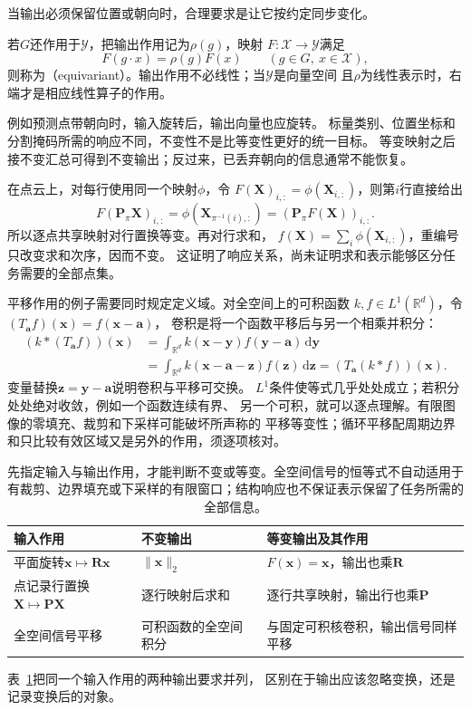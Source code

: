 当输出必须保留位置或朝向时，合理要求是让它按约定同步变化。
\begin{definition}[等变映射]
\label{def:geometry-equivariant-map}
若$G$还作用于$\mathcal Y$，把输出作用记为$\rho(g)$，映射
$F:\mathcal X\to\mathcal Y$满足
\begin{equation}
 F(g\cdot x)=\rho(g)F(x)\qquad(g\in G,\ x\in\mathcal X),
 \label{eq:geometry-equivariant-map}
\end{equation}
则称为（equivariant）。输出作用不必线性；当$\mathcal Y$是向量空间
且$\rho$为线性表示时，右端才是相应线性算子的作用。
\end{definition}
例如预测点带朝向时，输入旋转后，输出向量也应旋转。
标量类别、位置坐标和分割掩码所需的响应不同，不变性不是比等变性更好的统一目标。
等变映射之后接不变汇总可得到不变输出；反过来，已丢弃朝向的信息通常不能恢复。

在点云上，对每行使用同一个映射$\phi$，令
$F(\bm X)_{i,:}=\phi(\bm X_{i,:})$，则第$i$行直接给出
\[
 F(\bm P_\pi\bm X)_{i,:}
 =\phi(\bm X_{\pi^{-1}(i),:})
 =(\bm P_\pi F(\bm X))_{i,:}.
\]
所以逐点共享映射对行置换等变。再对行求和，
$f(\bm X)=\sum_i\phi(\bm X_{i,:})$，重编号只改变求和次序，因而不变。
这证明了响应关系，尚未证明求和表示能够区分任务需要的全部点集。

平移作用的例子需要同时规定定义域。对全空间上的可积函数
$k,f\in L^1(\mathbb R^d)$，令$(T_{\bm a}f)(\bm x)=f(\bm x-\bm a)$，
卷积是将一个函数平移后与另一个相乘并积分：
\begin{align}
 (k*(T_{\bm a}f))(\bm x)
 &=\int_{\mathbb R^d}k(\bm x-\bm y)f(\bm y-\bm a)\,\mathrm d\bm y\\
 &=\int_{\mathbb R^d}k(\bm x-\bm a-\bm z)f(\bm z)\,\mathrm d\bm z
   =(T_{\bm a}(k*f))(\bm x).
 \label{eq:geometry-translation-convolution-equivariance}
\end{align}
变量替换$\bm z=\bm y-\bm a$说明卷积与平移可交换。
$L^1$条件使等式几乎处处成立；若积分处处绝对收敛，例如一个函数连续有界、
另一个可积，就可以逐点理解。有限图像的零填充、裁剪和下采样可能破坏所声称的
平移等变性；循环平移配周期边界和只比较有效区域又是另外的作用，须逐项核对。

\begin{table}[htbp]
 \centering\small
 \begin{tabularx}{\linewidth}{@{}lXX@{}}
 \toprule
 输入作用 & 不变输出 & 等变输出及其作用\\
 \midrule
 平面旋转$\bm x\mapsto\bm R\bm x$
 & $\lVert\bm x\rVert_2$ & $F(\bm x)=\bm x$，输出也乘$\bm R$\\
 点记录行置换$\bm X\mapsto\bm P\bm X$
 & 逐行映射后求和 & 逐行共享映射，输出行也乘$\bm P$\\
 全空间信号平移
 & 可积函数的全空间积分 & 与固定可积核卷积，输出信号同样平移\\
 \bottomrule
 \end{tabularx}
 \caption{先指定输入与输出作用，才能判断不变或等变。全空间信号的恒等式不自动适用于
 有裁剪、边界填充或下采样的有限窗口；结构响应也不保证表示保留了任务所需的全部信息。}
 \label{tab:geometry-invariance-equivariance}
\end{table}
表~\ref{tab:geometry-invariance-equivariance}把同一个输入作用的两种输出要求并列，
区别在于输出应该忽略变换，还是记录变换后的对象。


